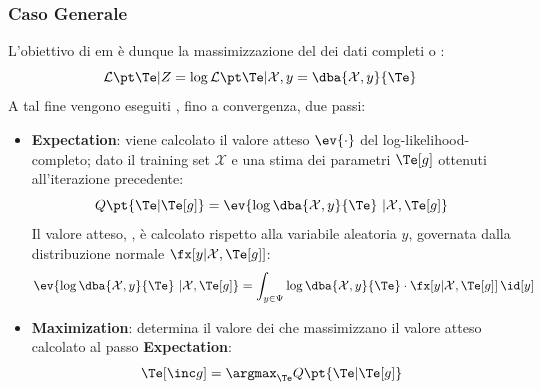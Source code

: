 \subsubsection{Caso Generale}\label{sec:caso_generale} %
L'obiettivo di \ac{em} è dunque la massimizzazione del  dei dati completi o :
\[
    \lkho{\Te}{Z} = \log{\lkho{\Te}{\mathcal X, y}} = \dba{\mathcal X, y}{\Te}
\]
A tal fine vengono eseguiti , fino a convergenza, due passi:
\begin{itemize}
    \item \textbf{Expectation}: viene calcolato il valore atteso $\ev{\cdot}$ del log-likelihood-completo; dato il training set $\mathcal X$ e una stima dei parametri $\Te[g]$ ottenuti all'iterazione precedente:
        \[
            Q\pt{\Te|\Te[g]} = \ev{\log{\dba{\mathcal X, y}{\Te}}\ |\mathcal X, \Te[g]}
        \]
        Il valore atteso, , è calcolato rispetto alla variabile aleatoria $y$, governata dalla distribuzione normale $\fx[{y|\mathcal X, \Te[g]}]$:
        \[
            \ev{\log{\dba{\mathcal X, y}{\Te}\ |\mathcal X, \Te[g]}} = \int_{y \in \Psi}{\log{\dba{\mathcal X, y}{\Te}} \cdot \fx[{y|\mathcal X, \Te[g]}]\,\id[y]}
        \]
    \item \textbf{Maximization}: determina il valore dei  che massimizzano il valore atteso calcolato al passo \textbf{Expectation}:
        \[
            \Te[\inc g] = \argmax_{\Te}{Q\pt{\Te | \Te[g]}}
        \]
\end{itemize}
%
